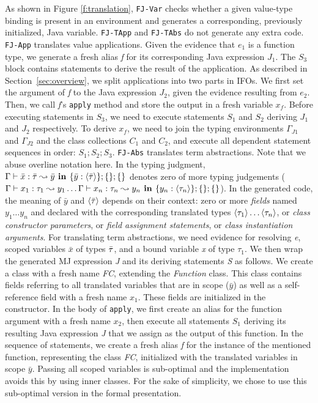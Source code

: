 As shown in Figure \ref{f:translation}, \texttt{FJ-Var} checks whether a given value-type binding
is present in an environment and generates a corresponding, previously initialized,
Java variable. \texttt{FJ-TApp} and \texttt{FJ-TAbs} do not generate any extra code.
\texttt{FJ-App} translates value applications. Given the evidence that
$e_1$ is a function type, we generate a fresh
alias \emph{f} for its corresponding Java expression $J_1$. The $S_3$
block contains statements to derive the result of the
application. As described in Section~\ref{sec:overview}, we split applications into
two parts in IFOs. We first set the argument of \emph{f} to the Java
expression $J_2$, given the evidence resulting from $e_2$. Then,
we call \emph{f}'s \lstinline{apply} method and store the output in a fresh
variable $x_f$. Before executing statements in $S_3$, we need to
execute statements $S_1$ and $S_2$ deriving $J_1$ and $J_2$ respectively.
To derive $x_f$, we need to join the typing environments $\Gamma_{J1}$ and $\Gamma_{J2}$
and the class collections $C_1$ and $C_2$, and execute all
dependent statement sequences in order: $S_1;S_2;S_3$.
\texttt{FJ-Abs} translates term abstractions. Note that we abuse overline notation here.
In the typing judgment, $\Gamma \vdash \bar{x} : \bar{\tau} \leadsto \bar{y} \textbf{~in~} \{\bar{y} : \langle\bar{\tau}\rangle\}; \{\};\{\}$
denotes zero of more typing judgements ( $\Gamma \vdash x_1 : \tau_1 \leadsto y_1 
\dots \Gamma \vdash x_n : \tau_n \leadsto y_n \textbf{~in~} \{y_n : \langle\tau_n\rangle\}; \{\};\{\}$).
In the generated code, the meaning of $\bar{y}$ and $\langle \bar{\tau} \rangle$ depends on their context:
zero or more \emph{fields} named $y_1\dots y_n$ and declared with the corresponding translated types
$\langle \tau_1 \rangle\dots\langle \tau_n \rangle$,
or \emph{class constructor parameters}, or \emph{field assignment statements}, or \emph{class
instantiation arguments}. For translating term abstractions, we need evidence for resolving
\emph{e}, scoped variables $\bar{x}$ of types $\bar{\tau}$, and a bound variable \emph{x} of type $\tau_1$.
We then wrap the generated MJ expression \emph{J} and its deriving statements
\emph{S} as follows. We create a class with a fresh name
\emph{FC}, extending the \emph{Function} class. This class contains
fields referring to all translated variables that are in scope ($\bar{y}$)
as well as a self-reference field with a fresh name $x_1$. These fields are initialized
in the constructor. In the body of \lstinline{apply}, we first create an alias for the function argument with a
fresh name $x_2$, then execute all statements $S_1$ deriving its
resulting Java expression \emph{J} that we assign as the output of
this function. 
In the sequence of statements, we create a fresh alias \emph{f} for the
instance of the mentioned function, representing the class
\emph{FC}, initialized with the translated variables in scope $\bar{y}$.
Passing all scoped variables is sub-optimal and the implementation avoids this by using
inner classes. For the sake of simplicity, we chose to use this sub-optimal version
in the formal presentation.


